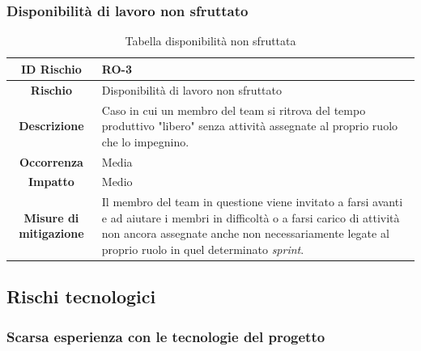 \documentclass[10pt, a4paper]{article}
\begin{document}
{{{\subsubsection{Disponibilità di lavoro non sfruttato}

{\renewcommand{\arraystretch}{1.5}
\begin{table}[H]
\begin{tabularx}{\textwidth}{c|X}
\textbf{ID Rischio} & RO-3 \\
\hline
\textbf{Rischio} & Disponibilità di lavoro non sfruttato \\
\hline
\textbf{Descrizione} & Caso in cui un membro del team si ritrova del tempo produttivo "libero" senza attività assegnate al proprio ruolo che lo impegnino.\\
\hline
\textbf{Occorrenza} & Media\\
\hline
\textbf{Impatto} & Medio\\
\hline
\textbf{Misure di mitigazione} & Il membro del team in questione viene invitato a farsi avanti e ad aiutare i membri in difficoltà o a farsi carico di attività non ancora assegnate anche non necessariamente legate al proprio ruolo in quel determinato \textit{sprint}. \\

\end{tabularx}
\caption{Tabella disponibilità non sfruttata}
\end{table}




\subsection{Rischi tecnologici}

\subsubsection{Scarsa esperienza con le tecnologie del progetto}

}}}}
\end{document}
